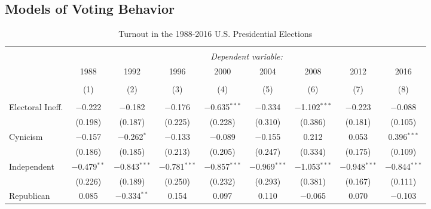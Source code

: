 \documentclass[12pt]{article}
\begin{document}
\begin{appendices}
\begin{refsection}




\clearpage
\section{Models of Voting Behavior}\label{app:votemodels}

\begin{table}[!htbp] \centering 
  \caption{Turnout in the 1988-2016 U.S. Presidential Elections}\label{tab:turnout} 
	\begin{adjustbox}{width=\textwidth,center}
	\begin{tabular}{@{\extracolsep{5pt}}lcccccccc} 
	\\[-1.8ex]\hline 
	\hline \\[-1.8ex] 
	 & \multicolumn{8}{c}{\textit{Dependent variable:}} \\ 
	\cline{2-9} 
	 & 1988 & 1992 & 1996 & 2000 & 2004 & 2008 & 2012 & 2016 \\ 
	\\[-1.8ex] & (1) & (2) & (3) & (4) & (5) & (6) & (7) & (8)\\ 
	\hline \\[-1.8ex] 
 Electoral Ineff. & $-$0.222 & $-$0.182 & $-$0.176 & $-$0.635$^{***}$ & $-$0.334 & $-$1.102$^{***}$ & $-$0.223 & $-$0.088 \\ 
  & (0.198) & (0.187) & (0.225) & (0.228) & (0.310) & (0.386) & (0.181) & (0.105) \\ 
 Cynicism & $-$0.157 & $-$0.262$^{*}$ & $-$0.133 & $-$0.089 & $-$0.155 & 0.212 & 0.053 & 0.396$^{***}$ \\ 
  & (0.186) & (0.185) & (0.213) & (0.205) & (0.247) & (0.334) & (0.175) & (0.109) \\ 
 Independent & $-$0.479$^{**}$ & $-$0.843$^{***}$ & $-$0.781$^{***}$ & $-$0.857$^{***}$ & $-$0.969$^{***}$ & $-$1.053$^{***}$ & $-$0.948$^{***}$ & $-$0.844$^{***}$ \\ 
  & (0.226) & (0.189) & (0.250) & (0.232) & (0.293) & (0.381) & (0.167) & (0.111) \\ 
 Republican & 0.085 & $-$0.334$^{**}$ & 0.154 & 0.097 & 0.110 & $-$0.065 & 0.070 & $-$0.103 \\ 

\end{tabular}
\end{adjustbox}
\end{table}
\end{refsection}
\end{appendices}
\end{document}
